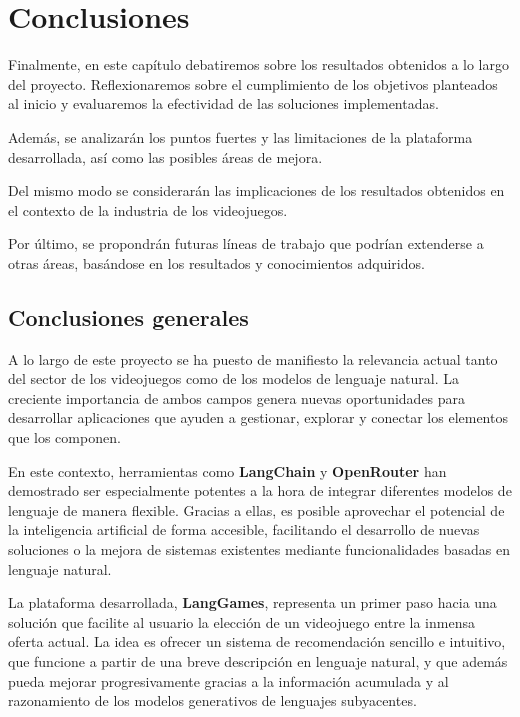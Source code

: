\chapter{Conclusiones}

Finalmente, en este capítulo debatiremos sobre los resultados obtenidos a lo largo del proyecto. Reflexionaremos sobre el cumplimiento de los objetivos planteados al inicio y evaluaremos la efectividad de las soluciones implementadas. 

Además, se analizarán los puntos fuertes y las limitaciones de la plataforma desarrollada, así como las posibles áreas de mejora. 


Del mismo modo se considerarán las implicaciones de los resultados obtenidos en el contexto de la industria de los videojuegos. 


Por último, se propondrán futuras líneas de trabajo que podrían extenderse a otras áreas, basándose en los resultados y conocimientos adquiridos.  

\newpage

\section{Conclusiones generales}

A lo largo de este proyecto se ha puesto de manifiesto la relevancia actual tanto del sector de los videojuegos como de los modelos de lenguaje natural. La creciente importancia de ambos campos genera nuevas oportunidades para desarrollar aplicaciones que ayuden a gestionar, explorar y conectar los elementos que los componen.

En este contexto, herramientas como \textbf{LangChain} y \textbf{OpenRouter} han demostrado ser especialmente potentes a la hora de integrar diferentes modelos de lenguaje de manera flexible. Gracias a ellas, es posible aprovechar el potencial de la inteligencia artificial de forma accesible, facilitando el desarrollo de nuevas soluciones o la mejora de sistemas existentes mediante funcionalidades basadas en lenguaje natural.

La plataforma desarrollada, \textbf{LangGames}, representa un primer paso hacia una solución que facilite al usuario la elección de un videojuego entre la inmensa oferta actual. La idea es ofrecer un sistema de recomendación sencillo e intuitivo, que funcione a partir de una breve descripción en lenguaje natural, y que además pueda mejorar progresivamente gracias a la información acumulada y al razonamiento de los modelos generativos de lenguajes subyacentes.

